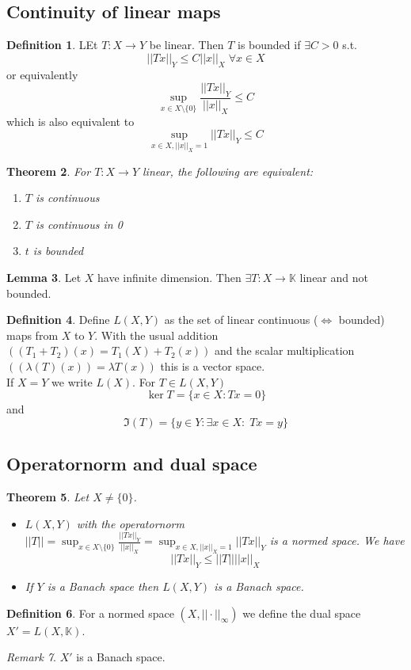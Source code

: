 \documentclass[a4paper, 12pt]{article}
\theoremstyle{plain}
\newtheorem{theorem}{Theorem}[subsection] %
\theoremstyle{definition}
\newtheorem{definition}[theorem]{Definition} %
\theoremstyle{lemma}
\newtheorem{lemma}[theorem]{Lemma}
\theoremstyle{remark}
\newtheorem{remark}[theorem]{Remark}
\theoremstyle{corollary}
\theoremstyle{example}
\begin{document}
	\subsection{Continuity of linear maps}
	\begin{definition}
		LEt $T:X\to Y$ be linear. Then $T$ is bounded if $\exists C>0$ s.t. \[||Tx||_Y \leq C||x||_X \; \forall x \in X\]
		or equivalently \[\sup_{x \in X\setminus \{0\}} \frac{||Tx||_Y}{||x||_X} \leq C\] which is also equivalent to \[\sup_{x \in X, ||x||_X=1} ||Tx||_Y \leq C\]
	\end{definition}
	\begin{theorem}
		For $T: X \to Y$ linear, the following are equivalent: \begin{enumerate}
			\item $T$ is continuous 
			\item $T$ is continuous in 0
			\item $t$ is bounded
		\end{enumerate}
	\end{theorem}
	\begin{lemma}
		Let $X$ have infinite dimension. Then $\exists T: X \to \mathbb{K}$ linear and not bounded.
	\end{lemma}
	\begin{definition}
		Define $L(X,Y)$ as the set of linear continuous ($\Leftrightarrow$ bounded) maps from $X$ to $Y$. With the usual addition $((T_1+T_2)(x) = T_1(X) + T_2(x))$ and the scalar multiplication $((\lambda(T)(x)) = \lambda T(x))$ this is a vector space.\\
		If $X=Y$ we write $L(X)$. For $T \in L(X,Y)$ \[\ker T = \{x \in X: Tx = 0\}\] and \[\Im(T) = \{y \in Y: \exists x\in X: \; Tx = y\}\]
	\end{definition}
	\subsection{Operatornorm and dual space}
	\begin{theorem}
		Let $X \neq \{0\}$. \begin{itemize}
			\item $L(X,Y)$ with the operatornorm $||T|| = \sup_{x \in X\setminus \{0\}} \frac{||Tx||_Y}{||x||_X} = \sup_{x \in X, ||x||_X=1} ||Tx||_Y$ is a normed space. We have \[||Tx||_Y \leq ||T||||x||_X\]
			\item If $Y$ is a Banach space then $L(X,Y)$ is a Banach space.
		\end{itemize}
	\end{theorem}
	\begin{definition}
		For a normed space $(X,||\cdot||_\infty)$ we define the dual space $X' = L(X,\mathbb{K})$. 
	\end{definition}
	\begin{remark}
		$X'$ is a Banach space.
	\end{remark}
\end{document}
